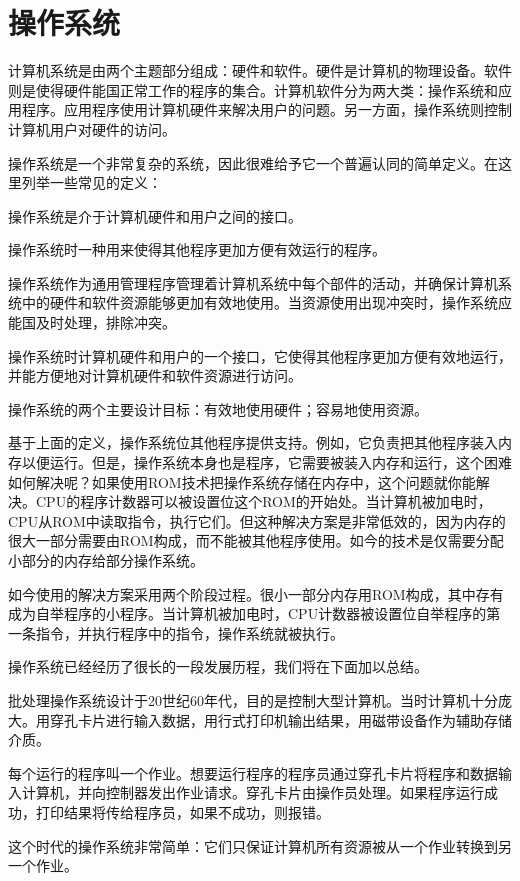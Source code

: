 \chapter{操作系统}
计算机系统是由两个主题部分组成：硬件和软件。硬件是计算机的物理设备。软件则是使得硬件能国正常工作的程序的集合。计算机软件分为两大类：操作系统和应用程序。应用程序使用计算机硬件来解决用户的问题。另一方面，操作系统则控制计算机用户对硬件的访问。

操作系统是一个非常复杂的系统，因此很难给予它一个普遍认同的简单定义。在这里列举一些常见的定义：

操作系统是介于计算机硬件和用户之间的接口。

操作系统时一种用来使得其他程序更加方便有效运行的程序。

操作系统作为通用管理程序管理着计算机系统中每个部件的活动，并确保计算机系统中的硬件和软件资源能够更加有效地使用。当资源使用出现冲突时，操作系统应能国及时处理，排除冲突。

操作系统时计算机硬件和用户的一个接口，它使得其他程序更加方便有效地运行，并能方便地对计算机硬件和软件资源进行访问。

操作系统的两个主要设计目标：有效地使用硬件；容易地使用资源。

基于上面的定义，操作系统位其他程序提供支持。例如，它负责把其他程序装入内存以便运行。但是，操作系统本身也是程序，它需要被装入内存和运行，这个困难如何解决呢？如果使用ROM技术把操作系统存储在内存中，这个问题就你能解决。CPU的程序计数器可以被设置位这个ROM的开始处。当计算机被加电时，CPU从ROM中读取指令，执行它们。但这种解决方案是非常低效的，因为内存的很大一部分需要由ROM构成，而不能被其他程序使用。如今的技术是仅需要分配小部分的内存给部分操作系统。

如今使用的解决方案采用两个阶段过程。很小一部分内存用ROM构成，其中存有成为自举程序的小程序。当计算机被加电时，CPU计数器被设置位自举程序的第一条指令，并执行程序中的指令，操作系统就被执行。

操作系统已经经历了很长的一段发展历程，我们将在下面加以总结。

批处理操作系统设计于20世纪60年代，目的是控制大型计算机。当时计算机十分庞大。用穿孔卡片进行输入数据，用行式打印机输出结果，用磁带设备作为辅助存储介质。

每个运行的程序叫一个作业。想要运行程序的程序员通过穿孔卡片将程序和数据输入计算机，并向控制器发出作业请求。穿孔卡片由操作员处理。如果程序运行成功，打印结果将传给程序员，如果不成功，则报错。

这个时代的操作系统非常简单：它们只保证计算机所有资源被从一个作业转换到另一个作业。

